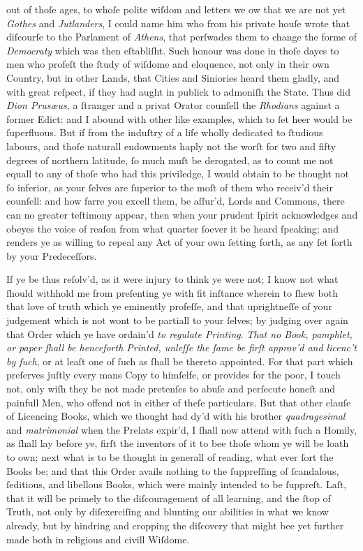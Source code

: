 out of thoſe ages, to whoſe polite wiſdom and letters we ow that we are not yet
\textit{Gothes} and \textit{Jutlanders}, I could name him who from his private
houſe wrote that diſcourſe to the Parlament of \textit{Athens}, that perſwades
them to change the forme of \textit{Democraty} which was then eſtabliſht.  Such
honour was done in thoſe dayes to men who profeſt the ſtudy of wiſdome and
eloquence, not only in their own Country, but in other Lands, that Cities and
Siniories heard them gladly, and with great reſpect, if they had aught in
publick to admoniſh the State.  Thus did \textit{Dion Prusæus}, a ſtranger and a
privat Orator counſell the \textit{Rhodians} against a former Edict: and I
abound with other like examples, which to ſet heer would be ſuperfluous.  But if
from the induſtry of a life wholly dedicated to ſtudious labours, and thoſe
naturall endowments haply not the worſt for two and fifty degrees of northern
latitude, ſo much muſt be derogated, as to count me not equall to any of thoſe
who had this priviledge, I would obtain to be thought not ſo inferior, as your
ſelves are ſuperior to the moſt of them who receiv'd their counſell: and how
farre you excell them, be aſſur'd, Lords and Commons, there can no greater
teſtimony appear, then when your prudent ſpirit acknowledges and obeyes the
voice of reaſon from what quarter ſoever it be heard ſpeaking; and renders ye as
willing to repeal any Act of your own ſetting forth, as any ſet forth by your
Predeceſſors.

If ye be thus reſolv'd, as it were injury to think ye were not; I know not what
ſhould withhold me from preſenting ye with fit inſtance wherein to ſhew both
that love of truth which ye eminently profeſſe, and that uprightneſſe of your
judgement which is not wont to be partiall to your ſelves; by judging over again
that Order which ye have ordain'd \textit{to regulate Printing}.  \textit{That
no Book, pamphlet, or paper ſhall be henceforth Printed, unleſſe the ſame be
firſt approv'd and licenc't by ſuch}, or at leaſt one of ſuch as ſhall be
thereto appointed.  For that part which preſerves juſtly every mans Copy to
himſelfe, or provides for the poor, I touch not, only wiſh they be not made
pretenſes to abuſe and perſecute honeſt and painfull Men, who offend not in
either of theſe particulars.  But that other clauſe of Licencing Books, which we
thought had dy'd with his brother \textit{quadragesimal} and
\textit{matrimonial} when the Prelats expir'd, I ſhall now attend with ſuch a
Homily, as ſhall lay before ye, firſt the inventors of it to bee thoſe whom ye
will be loath to own; next what is to be thought in generall of reading, what
ever ſort the Books be; and that this Order avails nothing to the ſuppreſſing of
ſcandalous, ſeditious, and libellous Books, which were mainly intended to be
ſuppreſt.  Laſt, that it will be primely to the diſcouragement of all learning,
and the ſtop of Truth, not only by diſexerciſing and blunting our abilities in
what we know already, but by hindring and cropping the diſcovery that might bee
yet further made both in religious and civill Wiſdome.


